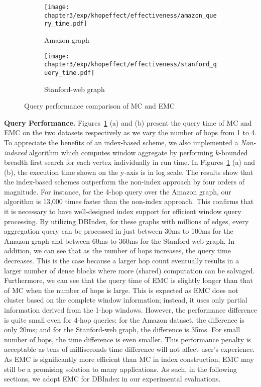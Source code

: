 \begin{figure}[h]
\centering
\begin{subfigure}{0.48\linewidth}
\centering
  \texttt{[image: chapter3/exp/khopeffect/effectiveness/amazon\_query\_time.pdf]}
  \caption{Amazon graph}
\end{subfigure}%
\begin{subfigure}{0.48\linewidth}
\centering
  \texttt{[image: chapter3/exp/khopeffect/effectiveness/stanford\_query\_time.pdf]}
  \caption{Stanford-web graph}
\end{subfigure}
\caption{Query performance comparison of MC and EMC}
\label{fig:khop_effective_query_time}
\end{figure}

\textbf{Query Performance.}       
Figures~\ref{fig:khop_effective_query_time} (a) and (b)
present the query time of MC and EMC 
on the two datasets respectively 
as we vary the number of hops from 1 to 4.
To appreciate the benefits of an index-based scheme, we also implemented
a \emph{Non-indexed} algorithm which computes window aggregate by performing $k$-bounded breadth
first search for each vertex individually in run time.
In Figures~\ref{fig:khop_effective_query_time} (a) and (b),
the execution time shown on the y-axis is in log scale. The results show that the index-based 
schemes outperform the non-index approach by four orders of magnitude. 
For instance, for the 4-hop query over the Amazon graph, 
our algorithm is 13,000 times faster than the non-index approach. 
This confirms that it is necessary to have well-designed index support 
for efficient window query processing. By utilizing DBIndex, 
for these graphs with millions of edges, every aggregation query 
can be processed in just between 30ms to 100ms for the Amazon graph and 
between 60ms to 360ms for the Stanford-web graph. In addition, we can 
see that as the number of hops increases, the query time decreases. 
This is the case because a larger hop count eventually results in a larger
number of dense blocks where more (shared) computation can be salvaged. 
Furthermore, we can see that the query time of EMC is slightly longer 
than that of MC when the number of hops is large. This is expected as 
EMC does not cluster based on the complete window information; instead, it
uses only partial information derived from the 1-hop windows. 
However, the performance difference is quite small even for 4-hop queries: for
the Amazon dataset, the difference is only 20ms; and for the Stanford-web
graph, the difference is 35ms. 
For small number of hops, the time difference is even smaller. 
This performance penalty is acceptable as tens of milliseconds time 
difference will not affect user's experience.  As EMC is significantly more 
efficient than MC in index construction, EMC may still be a 
promising solution to many applications. As such, 
in the following sections, we adopt EMC for DBIndex in
our experimental evaluations.  
 

